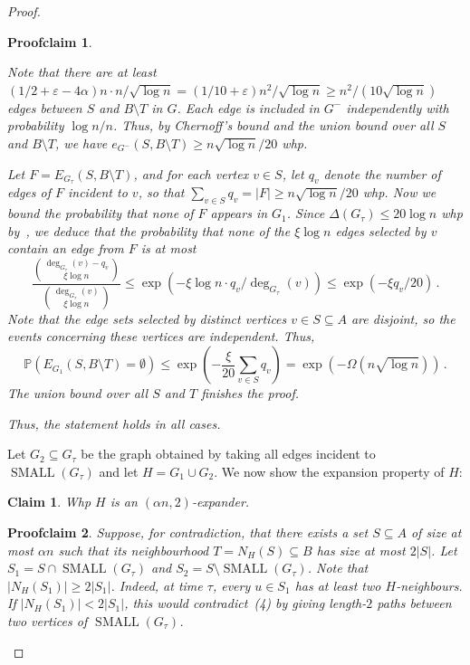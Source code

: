 \documentclass[10pt,a4paper]{amsart}
\newtheorem{claim}{Claim}
\newtheorem{proofclaim}{Proofclaim}
\renewcommand{\Pr}{\mathbb{P}}
\newcommand{\SMA}{\operatorname{SMALL}}
\newcommand{\eps}{\varepsilon}
\begin{document}
\begin{proof}
\begin{proofclaim}
\begin{itemize}
           Note that there are at least $(1/2 + \eps - 4\alpha)n\cdot n/\sqrt{\log n} = (1/10+\eps)n^2/\sqrt{\log n}\geq n^2/(10\sqrt{\log n})$ edges between $S$ and $B\setminus T$ in $G$.
            Each edge is included in $G^-$ independently with probability $\log n/n$. Thus, by Chernoff's bound and the union bound over all $S$ and $B\setminus T$, we have $e_{G^-}(S,B\setminus T)\geq n\sqrt{\log n}/20$ whp. 
            
            Let $F = E_{G_\tau}(S,B\setminus T)$, and for each vertex $v\in S$, let $q_v$ denote the number of edges of $F$ incident to $v$, so that $\sum_{v\in S}q_v = |F|\geq n\sqrt{\log n}/20$ whp.
            Now we bound the probability that none of $F$ appears in $G_1$. 
            Since $\Delta(G_\tau)\leq 20\log n$ whp by~, 
            we deduce that the probability that none of the $\xi\log n$ edges selected by $v$ contain an edge from $F$ is at most 
            \[
                \frac{\binom{\deg_{G_\tau}(v)-q_v}{\xi\log n}}{\binom{\deg_{G_\tau}(v)}{\xi\log n}}\leq \exp(-\xi\log n\cdot q_v/\deg_{G_\tau}(v))\leq \exp(-\xi q_v/20)\,.
            \]
            Note that the edge sets selected by distinct vertices $v\in S\subseteq A$ are disjoint, so the events concerning these vertices are independent. Thus, 
            \[
                \Pr(E_{G_1}(S,B\setminus T) = \emptyset)\leq \exp\left(-\frac{\xi}{20}\sum_{v\in S}q_v\right) = \exp(-\Omega(n\sqrt{\log n}))\,.
            \]
            The union bound over all $S$ and $T$ finishes the proof. 
        \end{itemize}
        Thus, the statement holds in all cases.
    \end{proofclaim}
    Let $G_2\subseteq G_\tau$ be the graph obtained by taking all edges incident to $\SMA(G_\tau)$ and let $H = G_1\cup G_2$. 
    We now show the expansion property of $H$:
    \begin{claim}\label{cla:G-expander}
        Whp $H$ is an $(\alpha n,2)$-expander.
    \end{claim}
    \begin{proofclaim}
        Suppose, for contradiction, that there exists a set $S\subseteq A$ of size at most $\alpha n$ such that its neighbourhood $T = N_{H}(S)\subseteq B$ has size at most $2|S|$. 
        Let $S_1 = S \cap \SMA(G_\tau)$ and $S_2 = S\setminus \SMA(G_\tau)$. 
        Note that $|N_{H}(S_1)| \geq 2|S_1|$. 
        Indeed, at time $\tau$, every $u\in S_1$ has at least two $H$-neighbours. If $|N_H(S_1)|<2|S_1|$, this would contradict~(4) by giving length-$2$ paths between two vertices of $\SMA(G_\tau)$.

\end{proofclaim}
\end{proof}
\end{document}
